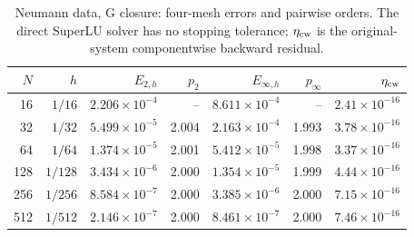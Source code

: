 \begin{table}[htbp]
\centering
\small
\setlength{\tabcolsep}{4pt}
\begin{tabular}{rrrrrrr}
\toprule
$N$ & $h$ & $E_{2,h}$ & $p_2$ & $E_{\infty,h}$ & $p_\infty$ & $\eta_{\rm cw}$ \\
\midrule
16 & $1/16$ & $2.206\times10^{-4}$ & -- & $8.611\times10^{-4}$ & -- & $2.41\times10^{-16}$ \\
32 & $1/32$ & $5.499\times10^{-5}$ & 2.004 & $2.163\times10^{-4}$ & 1.993 & $3.78\times10^{-16}$ \\
64 & $1/64$ & $1.374\times10^{-5}$ & 2.001 & $5.412\times10^{-5}$ & 1.998 & $3.37\times10^{-16}$ \\
128 & $1/128$ & $3.434\times10^{-6}$ & 2.000 & $1.354\times10^{-5}$ & 1.999 & $4.44\times10^{-16}$ \\
256 & $1/256$ & $8.584\times10^{-7}$ & 2.000 & $3.385\times10^{-6}$ & 2.000 & $7.15\times10^{-16}$ \\
512 & $1/512$ & $2.146\times10^{-7}$ & 2.000 & $8.461\times10^{-7}$ & 2.000 & $7.46\times10^{-16}$ \\
\bottomrule
\end{tabular}
\caption{Neumann data, G closure: four-mesh errors and pairwise orders. The direct SuperLU solver has no stopping tolerance; $\eta_{\rm cw}$ is the original-system componentwise backward residual.}
\label{tab:refinement-neumann-ghost}
\end{table}
